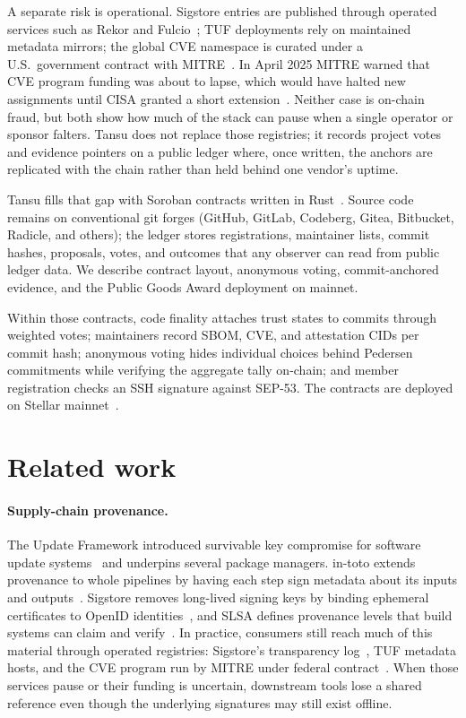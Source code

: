 \documentclass[11pt]{article}
\newcommand{\tansu}{Tansu}
\begin{document}
A separate risk is operational. Sigstore entries are published through operated
services such as Rekor and Fulcio~\citep{newman2022sigstore,sigstore_rekor};
TUF deployments rely on maintained metadata mirrors; the global CVE namespace
is curated under a U.S.\ government contract with
MITRE~\citep{cveprogram}. In April 2025 MITRE warned that CVE program funding
was about to lapse, which would have halted new assignments until CISA granted
a short extension~\citep{mitre_cve_funding2025}. Neither case is on-chain
fraud, but both show how much of the stack can pause when a single operator or
sponsor falters. \tansu{} does not replace those registries; it records project
votes and evidence pointers on a public ledger where, once written, the anchors
are replicated with the chain rather than held behind one vendor's uptime.

\tansu{} fills that gap with Soroban contracts written in
Rust~\citep{stellar_soroban}. Source code remains on conventional git forges
(GitHub, GitLab, Codeberg, Gitea, Bitbucket, Radicle, and others); the
ledger stores registrations, maintainer lists, commit hashes, proposals, votes,
and outcomes that any observer can read from public ledger data. We describe
contract layout, anonymous voting, commit-anchored evidence, and the Public
Goods Award deployment on mainnet.

Within those contracts, code finality attaches trust states to commits through
weighted votes; maintainers record SBOM, CVE, and attestation CIDs per commit
hash; anonymous voting hides individual choices behind Pedersen commitments
while verifying the aggregate tally on-chain; and member registration checks an
SSH signature against SEP-53. The contracts are deployed on Stellar
mainnet~\citep{stellar_expert_tansu}.

\section{Related work}
\label{sec:related}

\paragraph{Supply-chain provenance.}
The Update Framework introduced survivable key compromise for software update
systems~\citep{tuf} and underpins several package managers. in-toto extends
provenance to whole pipelines by having each step sign metadata about its
inputs and outputs~\citep{in_toto}. Sigstore removes long-lived signing keys
by binding ephemeral certificates to OpenID
identities~\citep{newman2022sigstore}, and SLSA defines provenance levels that
build systems can claim and verify~\citep{slsa}. In practice, consumers still
reach much of this material through operated registries: Sigstore's transparency
log~\citep{sigstore_rekor}, TUF metadata hosts, and the CVE program run by
MITRE under federal contract~\citep{cveprogram,mitre_cve_funding2025}. When
those services pause or their funding is uncertain, downstream tools lose a
shared reference even though the underlying signatures may still exist
offline.
\end{document}
